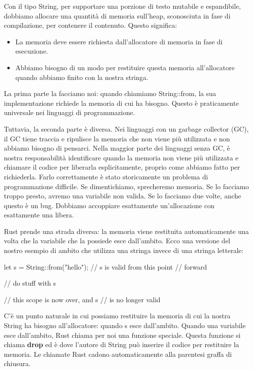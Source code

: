 \documentclass[11pt,a4paper]{article}
\begin{document}
{Con il tipo String, per supportare una porzione di testo mutabile e espandibile, dobbiamo allocare una quantità di memoria sull'heap, sconosciuta in fase di compilazione, per contenere il contenuto. Questo significa:
\begin{itemize}
\item La memoria deve essere richiesta dall'allocatore di memoria in fase di esecuzione.
\item Abbiamo bisogno di un modo per restituire questa memoria all'allocatore quando abbiamo finito con la nostra stringa.
\end{itemize}
La prima parte la facciamo noi: quando chiamiamo String::from, la sua implementazione richiede la memoria di cui ha bisogno. Questo è praticamente universale nei linguaggi di programmazione.

Tuttavia, la seconda parte è diversa. Nei linguaggi con un garbage collector (GC), il GC tiene traccia e ripulisce la memoria che non viene più utilizzata e non abbiamo bisogno di pensarci. Nella maggior parte dei linguaggi senza GC, è nostra responsabilità identificare quando la memoria non viene più utilizzata e chiamare il codice per liberarla esplicitamente, proprio come abbiamo fatto per richiederla. Farlo correttamente è stato storicamente un problema di programmazione difficile. Se dimentichiamo, sprecheremo memoria. Se lo facciamo troppo presto, avremo una variabile non valida. Se lo facciamo due volte, anche questo è un bug. Dobbiamo accoppiare esattamente un'allocazione con esattamente una libera.

Rust prende una strada diversa: la memoria viene restituita automaticamente una volta che la variabile che la possiede esce dall'ambito. Ecco una versione del nostro esempio di ambito che utilizza una stringa invece di una stringa letterale:

\begin{rust}
    {
        let s = String::from("hello"); // s is valid from this point
        				// forward

        // do stuff with s
    }                                  // this scope is now over, and s 
                                       // is no longer valid
\end{rust}
C'è un punto naturale in cui possiamo restituire la memoria di cui la nostra String ha bisogno all'allocatore: quando s esce dall'ambito. Quando una variabile esce dall'ambito, Rust chiama per noi una funzione speciale. Questa funzione si chiama \textbf{drop} ed è dove l'autore di String può inserire il codice per restituire la memoria. Le chiamate Rust cadono automaticamente alla parentesi graffa di chiusura.

}
\end{document}
